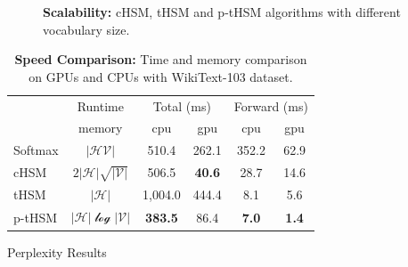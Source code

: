 \documentclass[final,t,unknownkeysallowed]{beamer}
\begin{document}
\begin{frame}{}
\begin{columns}[t]
\begin{column}{.3\linewidth}
    \begin{figure}\small
      \caption{\textbf{Scalability:}  cHSM, tHSM and p-tHSM algorithms with different vocabulary size. }
      \setlength{\abovecaptionskip}{0pt}
        \setlength{\abovedisplayskip}{0pt}
        \setlength{\belowcaptionskip}{0pt}
        \setlength{\belowdisplayskip}{0pt}
      \end{figure}
      
      
    
    \begin{table}
    \setlength{\abovecaptionskip}{0pt}
    \setlength{\abovedisplayskip}{0pt}
    \centering
    \caption{\textbf{Speed Comparison:} Time and memory comparison on GPUs and CPUs with WikiText-103 dataset.}
    \begin{tabular}{lccccc}
    \toprule
    &Runtime &\multicolumn{2}{c}{Total (ms)} & \multicolumn{2}{c}{Forward (ms)}   \\
    \cmidrule(lr){3-4}  \cmidrule(lr){5-6}
	&memory &cpu&gpu &cpu&	gpu \\ \midrule
    Softmax & $\mathcal{|HV|}$ &510.4  &262.1&352.2& 62.9 \\
    cHSM    & $2\mathcal{|H|\sqrt{|V|}}$&506.5  &\textbf{40.6}&28.7&14.6 \\
    tHSM    &$\mathcal{|H|}$&1,004.0 &444.4 & 8.1&  5.6   \\
    p-tHSM  &$\mathcal{|H|\log{|V|}}$ &\textbf{383.5}&	86.4 &\textbf{7.0}&	\textbf{1.4} \\
    \bottomrule
    \end{tabular}
    \end{table}

      \begin{block}{Perplexity Results}


\end{block}
\end{column}
\end{columns}
\end{frame}
\end{document}
